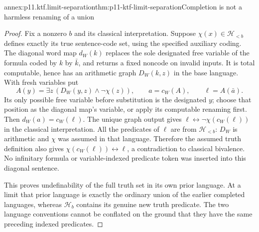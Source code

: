 \begin{annexitem}{annex:p11.ktf.limit-separation}{thm:p11-ktf-limit-separation}{Completion is not a harmless renaming of a union}
\begin{proof}
Fix a nonzero \(b\) and its classical interpretation. Suppose
\(\chi(x)\in\mathcal H_{<b}\) defines exactly its true
sentence-code set, using the specified auxiliary coding. The diagonal
word map \(d_W(k)\) replaces the sole designated free variable
of the formula coded by \(k\) by \(\bar k\), and returns
a fixed noncode on invalid inputs. It is total computable, hence
has an arithmetic graph \(D_W(k,z)\) in the base language.
With fresh variables put
\[
 A(y)=\exists z\,(D_W(y,z)\land\neg\chi(z)),
 \qquad a=c_W(A),\qquad \ell=A(\bar a).
\]
Its only possible free variable before substitution is the designated
\(y\); choose that position as the diagonal map's variable,
or apply its computable renaming first. Then
\(d_W(a)=c_W(\ell)\). The unique graph output gives
\(\ell\leftrightarrow\neg\chi(c_W(\ell))\) in the
classical interpretation. All the predicates of \(\ell\)
are from \(\mathcal H_{<b}\): \(D_W\) is arithmetic
and \(\chi\) was assumed in that language. Therefore the
assumed truth definition also gives
\(\chi(c_W(\ell))\leftrightarrow\ell\), a contradiction
to classical bivalence. No infinitary formula or variable-indexed
predicate token was inserted into this diagonal sentence.

This proves undefinability of the full truth set in its own prior
language. At a limit that prior language is exactly the ordinary
union of the earlier completed languages, whereas
\(\mathcal H_b\) contains its genuine new truth predicate.
The two language conventions cannot be conflated on the ground
that they have the same preceding indexed predicates.
\end{proof}
\end{annexitem}

